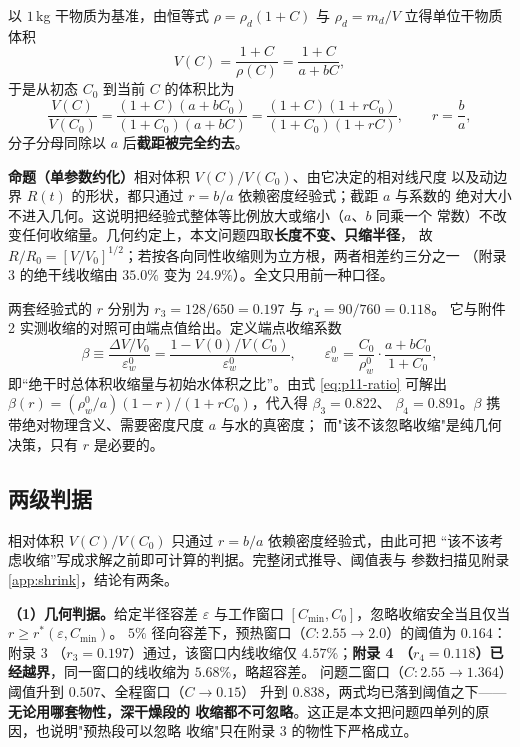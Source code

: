 \documentclass[12pt,a4paper,fontset=none]{ctexart}
\begin{document}
以 $1$\,kg 干物质为基准，由恒等式 $\rho=\rho_d(1+C)$ 与 $\rho_d=m_d/V$
立得单位干物质体积
\begin{equation}
  V(C)=\frac{1+C}{\rho(C)}=\frac{1+C}{a+bC},
  \label{eq:p11-v}
\end{equation}
于是从初态 $C_0$ 到当前 $C$ 的体积比为
\begin{equation}
  \frac{V(C)}{V(C_0)}
  =\frac{(1+C)(a+bC_0)}{(1+C_0)(a+bC)}
  =\frac{(1+C)(1+rC_0)}{(1+C_0)(1+rC)},
  \qquad r=\frac{b}{a},
  \label{eq:p11-ratio}
\end{equation}
分子分母同除以 $a$ 后\textbf{截距被完全约去}。

\textbf{命题（单参数约化）}\quad 相对体积 $V(C)/V(C_0)$、由它决定的相对线尺度
以及动边界 $R(t)$ 的形状，都只通过 $r=b/a$ 依赖密度经验式；截距 $a$ 与系数的
绝对大小不进入几何。这说明把经验式整体等比例放大或缩小（$a$、$b$ 同乘一个
常数）不改变任何收缩量。几何约定上，本文问题四取\textbf{长度不变、只缩半径}，
故 $R/R_0=[V/V_0]^{1/2}$；若按各向同性收缩则为立方根，两者相差约三分之一
（附录 3 的绝干线收缩由 $35.0\%$ 变为 $24.9\%$）。全文只用前一种口径。

两套经验式的 $r$ 分别为 $r_3=128/650=0.197$ 与 $r_4=90/760=0.118$。
它与附件 2 实测收缩的对照可由端点值给出。定义端点收缩系数
\begin{equation}
  \beta\equiv\frac{\Delta V/V_0}{\varepsilon_w^0}
  =\frac{1-V(0)/V(C_0)}{\varepsilon_w^0},\qquad
  \varepsilon_w^0=\frac{C_0}{\rho_w^0}\cdot\frac{a+bC_0}{1+C_0},
  \label{eq:p11-beta}
\end{equation}
即“绝干时总体积收缩量与初始水体积之比”。由式 \eqref{eq:p11-ratio} 可解出
$\beta(r)=(\rho_w^0/a)(1-r)/(1+rC_0)$，代入得 $\beta_3=0.822$、
$\beta_4=0.891$。$\beta$ 携带绝对物理含义、需要密度尺度 $a$ 与水的真密度；
而"该不该忽略收缩"是纯几何决策，只有 $r$ 是必要的。

\subsection{两级判据}
\label{sec:p11-criteria}

相对体积 $V(C)/V(C_0)$ 只通过 $r=b/a$ 依赖密度经验式，由此可把
“该不该考虑收缩”写成求解之前即可计算的判据。完整闭式推导、阈值表与
参数扫描见附录 \ref{app:shrink}，结论有两条。

\textbf{（1）几何判据。}给定半径容差 $\varepsilon$ 与工作窗口
$[C_{\min},C_0]$，忽略收缩安全当且仅当 $r\ge r^\ast(\varepsilon,C_{\min})$。
$5\%$ 径向容差下，预热窗口（$C:2.55\to2.0$）的阈值为 $0.164$：附录 3
（$r_3=0.197$）通过，该窗口内线收缩仅 $4.57\%$；\textbf{附录 4
（$r_4=0.118$）已经越界}，同一窗口的线收缩为 $5.68\%$，略超容差。
问题二窗口（$C:2.55\to1.364$）阈值升到 $0.507$、全程窗口（$C\to0.15$）
升到 $0.838$，两式均已落到阈值之下——\textbf{无论用哪套物性，深干燥段的
收缩都不可忽略}。这正是本文把问题四单列的原因，也说明"预热段可以忽略
收缩"只在附录 3 的物性下严格成立。
\end{document}
